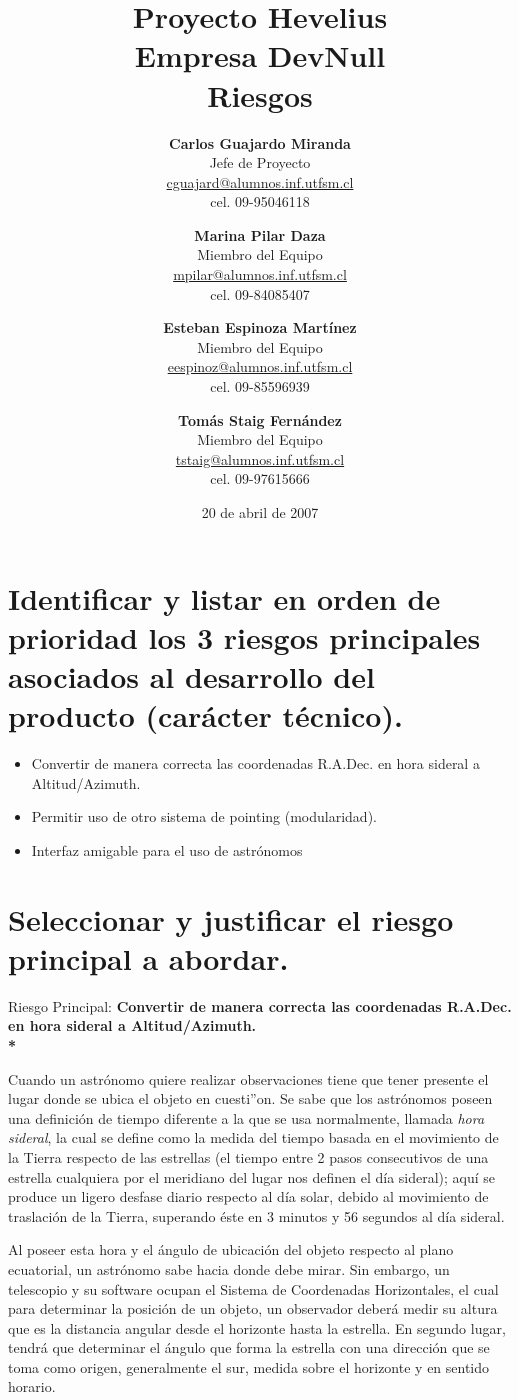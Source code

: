 \documentclass[letterpaper,spanish,10pt]{article}
\title{{\Huge \bf Proyecto Hevelius} \\ {\Large Empresa DevNull} \\ {\small Riesgos}}
\author{
{\bf Carlos Guajardo Miranda} \\ Jefe de Proyecto \\ \url{cguajard@alumnos.inf.utfsm.cl} \\ cel. 09-95046118 
\and
{\bf Marina Pilar Daza} \\ Miembro del Equipo \\ \url{mpilar@alumnos.inf.utfsm.cl} \\ cel. 09-84085407
\and
{\bf Esteban Espinoza Mart\'inez} \\ Miembro del Equipo \\ \url{eespinoz@alumnos.inf.utfsm.cl} \\ cel. 09-85596939
\and
{\bf Tom\'as Staig Fern\'andez} \\ Miembro del Equipo \\ \url{tstaig@alumnos.inf.utfsm.cl} \\ cel. 09-97615666
}
\date{20 de abril de 2007}
\begin{document}
\maketitle


%
%
\newpage

\section{Identificar y listar en orden de prioridad los 3 riesgos principales asociados al desarrollo del producto (carácter técnico).}

\begin{itemize}
	\item Convertir de manera correcta las coordenadas R.A.Dec. en hora sideral a Altitud/Azimuth.
	\item Permitir uso de otro sistema de pointing (modularidad).
	\item Interfaz amigable para el uso de astr\'onomos
\end{itemize}


\section{Seleccionar y justificar el riesgo principal a abordar.}

Riesgo Principal: \bf{Convertir de manera correcta las coordenadas R.A.Dec. en hora sideral a Altitud/Azimuth.}\\*

Cuando un astr\'onomo quiere realizar observaciones tiene que tener presente el lugar donde se ubica el objeto en cuesti''on.
Se sabe que los astr\'onomos poseen una definici\'on de tiempo diferente a la que se usa normalmente, llamada \textit{hora sideral},
la cual se define como la medida del tiempo basada en el movimiento de la Tierra respecto de las estrellas (el tiempo entre 2 
pasos consecutivos de una estrella cualquiera por el meridiano del lugar nos definen el d\'ia sideral); aqu\'i se produce un 
ligero desfase diario respecto al d\'ia solar, debido al movimiento de traslaci\'on de la Tierra, superando \'este en 3 minutos 
y 56 segundos al d\'ia sideral.

Al poseer esta hora y el ángulo de ubicaci\'on del objeto respecto al plano ecuatorial, un astr\'onomo sabe hacia donde debe mirar. 
Sin embargo, un telescopio y su software ocupan el Sistema de Coordenadas Horizontales, el cual para determinar la posici\'on de 
un objeto, un observador deber\'a medir su altura que es la distancia angular desde el horizonte hasta la estrella. En segundo lugar, 
tendrá que determinar el \'angulo que forma la estrella con una direcci\'on que se toma como origen, generalmente el sur, medida 
sobre el horizonte y en sentido horario.
\end{document}
